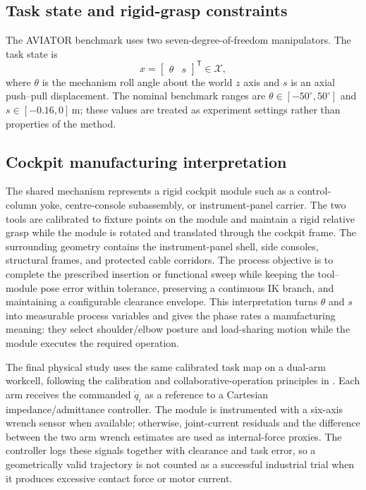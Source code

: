 \documentclass[preprint,12pt]{elsarticle}
\newcommand{\T}{^{\mathsf T}}
\begin{document}
\subsection{Task state and rigid-grasp constraints}

The AVIATOR benchmark uses two seven-degree-of-freedom manipulators. The task state is
\begin{equation}
 x = \begin{bmatrix}\theta & s\end{bmatrix}\T \in \mathcal X,
\label{eq:task_state}
\end{equation}
where $\theta$ is the mechanism roll angle about the world $z$ axis and $s$ is an axial push--pull displacement. The nominal benchmark ranges are $\theta\in[-50^{\circ},50^{\circ}]$ and $s\in[-0.16,0]\,\mathrm{m}$; these values are treated as experiment settings rather than properties of the method.

\subsection{Cockpit manufacturing interpretation}

The shared mechanism represents a rigid cockpit module such as a control-column yoke, centre-console subassembly, or instrument-panel carrier. The two tools are calibrated to fixture points on the module and maintain a rigid relative grasp while the module is rotated and translated through the cockpit frame. The surrounding geometry contains the instrument-panel shell, side consoles, structural frames, and protected cable corridors. The process objective is to complete the prescribed insertion or functional sweep while keeping the tool--module pose error within tolerance, preserving a continuous IK branch, and maintaining a configurable clearance envelope. This interpretation turns $\theta$ and $s$ into measurable process variables and gives the phase rates a manufacturing meaning: they select shoulder/elbow posture and load-sharing motion while the module executes the required operation.

The final physical study uses the same calibrated task map on a dual-arm workcell, following the calibration and collaborative-operation principles in \cite{calibration2022,iso10218,iso15066}. Each arm receives the commanded $\dot q_i$ as a reference to a Cartesian impedance/admittance controller. The module is instrumented with a six-axis wrench sensor when available; otherwise, joint-current residuals and the difference between the two arm wrench estimates are used as internal-force proxies. The controller logs these signals together with clearance and task error, so a geometrically valid trajectory is not counted as a successful industrial trial when it produces excessive contact force or motor current.
\end{document}
